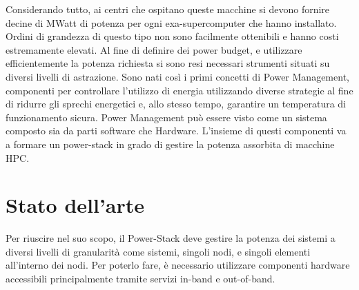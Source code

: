Considerando tutto, ai centri che ospitano queste macchine si devono fornire decine di MWatt di potenza per ogni exa-supercomputer che hanno installato. 
Ordini di grandezza di questo tipo non sono facilmente ottenibili e hanno costi estremamente elevati. 
Al fine di definire dei power budget, e utilizzare efficientemente la potenza richiesta si sono resi necessari strumenti situati su diversi livelli di astrazione. 
Sono nati così i primi concetti di Power Management, componenti per controllare l'utilizzo di energia utilizzando diverse strategie al fine di ridurre gli sprechi energetici e, allo stesso tempo, garantire un temperatura di funzionamento sicura.
Power Management può essere visto come un sistema composto sia da parti software che Hardware. L'insieme di questi componenti va a formare un power-stack in grado di gestire la potenza assorbita di macchine HPC.

\section{Stato dell'arte}
Per riuscire nel suo scopo, il Power-Stack deve gestire la potenza dei sistemi a diversi livelli di granularità come sistemi, singoli nodi, e singoli elementi all'interno dei nodi. Per poterlo fare, è necessario utilizzare componenti hardware accessibili principalmente tramite servizi in-band e out-of-band.


